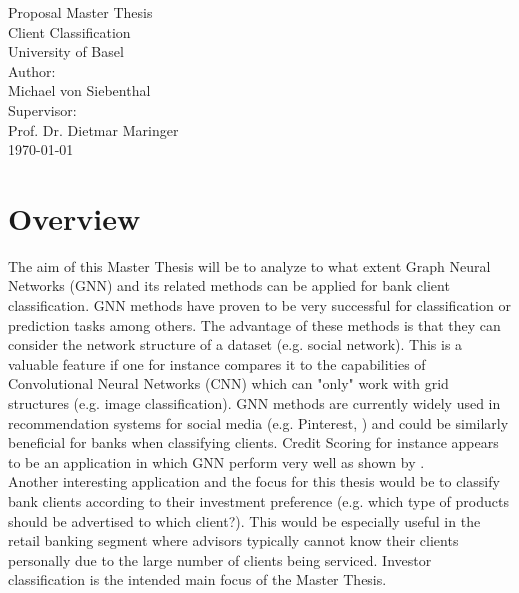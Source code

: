 \documentclass[12pt,a4paper]{article}
\begin{document}
	\begin{center}
	\vspace{1em}
	\large{Proposal Master Thesis}\\
	\huge Client Classification \\ 
	\large \vspace{1em}
	University of Basel\\
	\vspace{4em}
	\large
	Author: \\
	Michael von Siebenthal\\
	\vspace{2em}
	Supervisor: \\
	Prof. Dr. Dietmar Maringer\\
	\vspace{2em}
	\today
	\vspace{3em}
	\end{center}
	\thispagestyle{empty}
	\pagebreak
	\tableofcontents
	\pagebreak
	\onehalfspacing
	\setlength\abovedisplayskip{2.5pt}
	\setlength\belowdisplayskip{2.5pt}
	
	\section{Overview}
		
	The aim of this Master Thesis will be to analyze to what extent Graph Neural Networks (GNN) and its related methods \citep{kipf2016semi,hamilton2017inductive,velivckovic2017graph,vaswani2017attention} 
	can be applied for bank client classification. GNN methods have proven to be very successful for classification or prediction tasks among others. 
	The advantage of these methods is that they can consider the network structure of a dataset (e.g. social network). This is a valuable feature 
	if one for instance compares it to the capabilities of Convolutional Neural Networks (CNN) which can "only" work with grid structures 
	(e.g. image classification). GNN methods are currently widely used in recommendation systems for social media (e.g. Pinterest, \citet{ying2018graph})
	and could be similarly beneficial for banks when classifying clients. Credit Scoring for instance appears to be an application in which GNN perform 
	very well as shown by \citet{sukharev2020ews}. \\

	\noindent Another interesting application and the focus for this thesis would be to classify bank clients according to their investment preference 
	(e.g. which type of products should be advertised to which client?). This would be especially useful in the retail banking segment where advisors 
	typically cannot know their clients personally due to the large number of clients being serviced. Investor classification is the intended main focus 
	of the Master Thesis. \\
\end{document}
